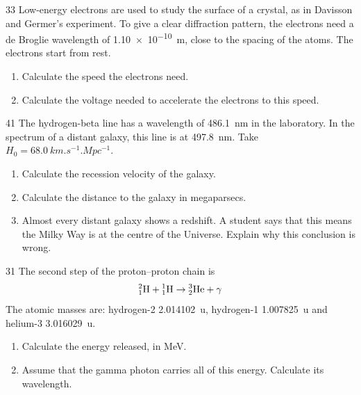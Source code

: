 \begin{practiceq}{3}{3}\label{pq:debroglie}
Low-energy electrons are used to study the surface of a crystal, as in Davisson and Germer's
experiment. To give a clear diffraction pattern, the electrons need a de Broglie wavelength
of \qty{1.10e-10}{m}, close to the spacing of the atoms. The electrons start from rest.
\begin{enumerate}[label=(\alph*)]
  \item Calculate the speed the electrons need. 
  \item Calculate the voltage needed to accelerate the electrons to this speed.
\end{enumerate}
\end{practiceq}

\begin{practiceq}{4}{1}\label{pq:hubble}
The hydrogen-beta line has a wavelength of \qty{486.1}{nm} in the laboratory. In the spectrum
of a distant galaxy, this line is at \qty{497.8}{nm}. Take
$H_0 = \qty{68.0}{km.s^{-1}.Mpc^{-1}}$.
\begin{enumerate}[label=(\alph*)]
  \item Calculate the recession velocity of the galaxy. 
  \item Calculate the distance to the galaxy in megaparsecs. 
  \item Almost every distant galaxy shows a redshift. A student says that this means the
        Milky Way is at the centre of the Universe. Explain why this conclusion is wrong.
\end{enumerate}
\end{practiceq}

\begin{practiceq}{3}{1}\label{pq:ppstep}
The second step of the proton--proton chain is
\[
  \pracNuc{2}{1}{H} + \pracNuc{1}{1}{H} \to \pracNuc{3}{2}{He} + \gamma
\]
The atomic masses are: hydrogen-2 \qty{2.014102}{\amu}, hydrogen-1 \qty{1.007825}{\amu}
and helium-3 \qty{3.016029}{\amu}.
\begin{enumerate}[label=(\alph*)]
  \item Calculate the energy released, in MeV. 
  \item Assume that the gamma photon carries all of this energy. Calculate its wavelength.
\end{enumerate}
\end{practiceq}

